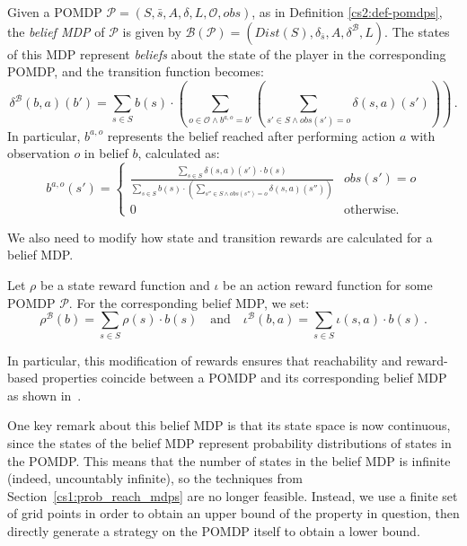 \begin{definition}
    \label{cs2:belief_mdps}

    Given a POMDP $\mathcal{P} = (S, \bar{s}, A, \delta, L, \mathcal{O}, obs)$, as in Definition \ref{cs2:def-pomdps}, the \emph{belief MDP} of $\mathcal{P}$ is given by $\mathcal{B}(\mathcal{P}) = (Dist(S), \delta_{\bar{s}}, A, \delta^\mathcal{B}, L)$. The states of this MDP represent \emph{beliefs} about the state of the player in the corresponding POMDP, and the transition function becomes:
    \begin{equation*}
        \delta^{\mathcal{B}}(b, a)(b') = \mbox{$\sum_{s \in S}$} b(s) \cdot \left( \mbox{$\sum_{o \in \mathcal{O} \wedge b^{a,o} = b'}$} \left(  \mbox{$\sum_{s' \in S \wedge obs(s')=o}$} \delta(s, a)(s') \right) \right) \, .
    \end{equation*}
    In particular, $b^{a, o}$ represents the belief reached after performing action $a$ with observation $o$ in belief $b$, calculated as:
    \begin{equation*}
        b^{a, o}(s') =
        \begin{cases}
            \frac{\displaystyle \mbox{$\sum\nolimits_{s \in S}$} \delta(s, a)(s') \cdot b(s)}{\displaystyle \mbox{$\sum\nolimits_{s \in S}$} b(s) \cdot \left(\mbox{$\sum_{s'' \in S \wedge obs(s'')=o}$} \delta(s,a)(s'')\right)} & obs(s') = o \\ 0 & \text{otherwise.}
        \end{cases}
    \end{equation*}
\end{definition}
We also need to modify how state and transition rewards are calculated for a belief MDP.

\begin{definition}
    \label{cs2:belief_rewards}
    Let $\rho$ be a state reward function and $\iota$ be an action reward function for some POMDP $\mathcal{P}$. For the corresponding belief MDP, we set:
\[        \rho^{\mathcal{B}}(b) = \mbox{$\sum_{s \in S}$} \rho(s) \cdot b(s) \quad \mbox{and} \quad
        \iota^{\mathcal{B}}(b, a) = \mbox{$\sum_{s \in S}$} \iota(s, a) \cdot b(s) \, .
\]
\end{definition}
In particular, this modification of rewards ensures that reachability and reward-based properties coincide between a POMDP and its corresponding belief MDP as shown in~\cite{norman_verification_2017}.

One key remark about this belief MDP is that its state space is now continuous, since the states of the belief MDP represent probability distributions of states in the POMDP. This means that the number of states in the belief MDP is infinite (indeed, uncountably infinite), so the techniques from Section~\ref{cs1:prob_reach_mdps} are no longer feasible. Instead, we use a finite set of grid points in order to obtain an upper bound of the property in question, then directly generate a strategy on the POMDP itself to obtain a lower bound. %

